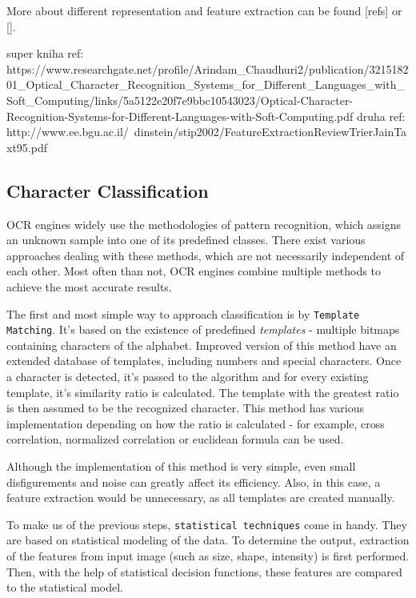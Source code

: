 More about different representation and feature extraction can be found [refs] or [].

super kniha ref: 
https://www.researchgate.net/profile/Arindam_Chaudhuri2/publication/321518201_Optical_Character_Recognition_Systems_for_Different_Languages_with_Soft_Computing/links/5a5122e20f7e9bbc10543023/Optical-Character-Recognition-Systems-for-Different-Languages-with-Soft-Computing.pdf
druha ref: http://www.ee.bgu.ac.il/~dinstein/stip2002/FeatureExtractionReviewTrierJainTaxt95.pdf

\subsection{Character Classification}

OCR engines widely use the methodologies of pattern recognition, which assigns an unknown sample into one of its predefined classes. There exist various approaches dealing with these methods, which are not necessarily independent of each other. Most often than not, OCR engines combine multiple methods to achieve the most accurate results.

The first and most simple way to approach classification is by \texttt{Template Matching}. It's based on the existence of predefined \emph{templates} - multiple bitmaps containing characters of the alphabet. Improved version of this method have an extended database of templates, including numbers and special characters. Once a character is detected, it's passed to the algorithm and for every existing template, it's similarity ratio is calculated. The template with the greatest ratio is then assumed to be the recognized character. This method has various implementation depending on how the ratio is calculated - for example, cross correlation, normalized correlation or euclidean formula can be used.

Although the implementation of this method is very simple, even small disfigurements and noise can greatly affect its efficiency. Also, in this case, a feature extraction would be unnecessary, as all templates are created manually.

To make us of the previous steps, \texttt{statistical techniques} come in handy. They are based on statistical modeling of the data. To determine the output, extraction of the features from input image (such as size, shape, intensity) is first performed. Then, with the help of statistical decision functions, these features are compared to the statistical model.

